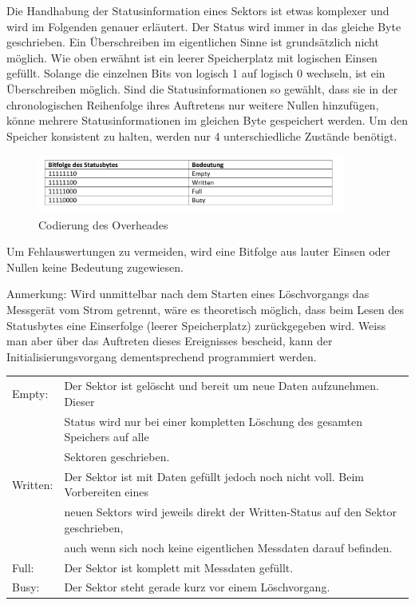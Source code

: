 Die Handhabung der Statusinformation eines Sektors ist etwas komplexer und wird im Folgenden genauer erläutert. Der Status wird immer in das gleiche Byte geschrieben. Ein Überschreiben im eigentlichen Sinne ist grundsätzlich nicht möglich. Wie oben erwähnt ist ein leerer Speicherplatz mit logischen Einsen gefüllt. Solange die einzelnen Bits von logisch 1 auf logisch 0 wechseln, ist ein Überschreiben möglich. Sind die Statusinformationen so gewählt, dass sie in der chronologischen Reihenfolge ihres Auftretens nur weitere Nullen hinzufügen, könne mehrere Statusinformationen im gleichen Byte gespeichert werden. Um den Speicher konsistent zu halten, werden nur 4 unterschiedliche Zustände benötigt.

\begin{figure}[H]
\begin{center}
\includegraphics[width=0.9\textwidth]{images/Software_Tabelle_4.png}
\caption{Codierung des Overheades}
\label{fig:Codierung_des_Overheades}
\end{center}
\end{figure}

Um Fehlauswertungen zu vermeiden, wird eine Bitfolge aus lauter Einsen oder Nullen keine Bedeutung zugewiesen. 

Anmerkung: Wird unmittelbar nach dem Starten eines Löschvorgangs das Messgerät vom Strom getrennt, wäre es theoretisch möglich, dass beim Lesen des Statusbytes eine Einserfolge (leerer Speicherplatz) zurückgegeben wird. Weiss man aber über das Auftreten dieses Ereignisses bescheid, kann der Initialisierungsvorgang dementsprechend programmiert werden.

\begin{table}[H]
\begin{tabular}{ll}
Empty:			&   Der Sektor ist gelöscht und bereit um neue Daten 								aufzunehmen. Dieser \\
				&   Status wird nur bei einer 														kompletten Löschung des gesamten Speichers auf alle \\
				&	Sektoren geschrieben.\\
Written:		&   Der Sektor ist mit Daten gefüllt jedoch noch nicht 						voll. Beim Vorbereiten eines \\
				&   neuen Sektors wird 	jeweils direkt der Written-Status 							auf den Sektor geschrieben,\\
				&   auch wenn sich noch keine eigentlichen 										Messdaten darauf befinden.\\
Full:			&   Der Sektor ist komplett mit Messdaten gefüllt.\\
Busy:			&   Der Sektor steht gerade kurz vor einem Löschvorgang.\\
\end{tabular}
\end{table}

